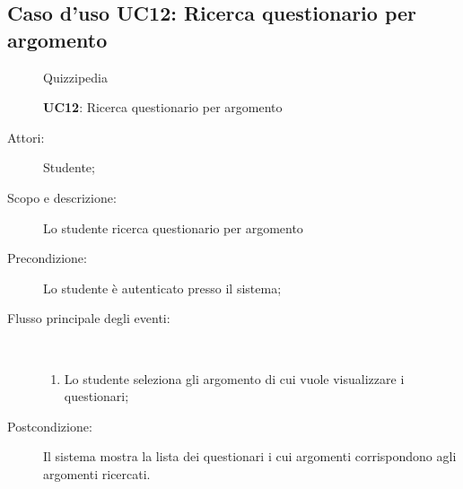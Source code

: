 \subsection{Caso d'uso UC12: Ricerca questionario per argomento}
	\begin{figure}[H]
		\centering
		\begin{resizedtikzpicture}{\textwidth}
		\begin{umlsystem}[x=0, fill=lightgray!20]{Quizzipedia}
		\end{umlsystem}
		\end{resizedtikzpicture}
		\caption{\textbf{UC12}: Ricerca questionario per argomento}
		\label{UC12}
	\end{figure}
\begin{description}
\item[Attori:] Studente;
\item[Scopo e descrizione:] Lo studente ricerca questionario per argomento
      \item[Precondizione:] Lo studente è autenticato presso il sistema;

        \item[Flusso principale degli eventi:] \ 
 \begin{enumerate}
          \item Lo studente seleziona gli argomento di cui vuole visualizzare i questionari;

      \end{enumerate}
    \item[Postcondizione:] Il sistema mostra la lista dei questionari i cui argomenti corrispondono agli argomenti ricercati.
  \end{description}
\hypertarget{UC13}{}
